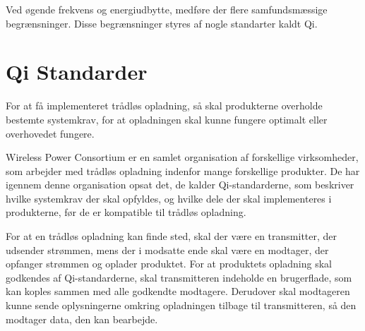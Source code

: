 Ved øgende frekvens og energiudbytte, medføre der flere samfundsmæssige begrænsninger. Disse begrænsninger styres af nogle standarter kaldt Qi.

\section{Qi Standarder}
For at få implementeret trådløs opladning, så skal produkterne overholde bestemte systemkrav, for at opladningen skal kunne fungere optimalt eller overhovedet fungere.

Wireless Power Consortium er en samlet organisation af forskellige virksomheder, som arbejder med trådløs opladning indenfor mange forskellige produkter. De har igennem denne organisation opsat det, de kalder Qi-standarderne, som beskriver hvilke systemkrav der skal opfyldes, og hvilke dele der skal implementeres i produkterne, før de er kompatible til trådløs opladning.

For at en trådløs opladning kan finde sted, skal der være en transmitter, der udsender strømmen, mens der i modsatte ende skal være en modtager, der opfanger strømmen og oplader produktet. For at produktets opladning skal godkendes af Qi-standarderne, skal transmitteren indeholde en brugerflade, som kan koples sammen med alle godkendte modtagere. Derudover skal modtageren kunne sende oplysningerne omkring opladningen tilbage til transmitteren, så den modtager data, den kan bearbejde. \cite{}
\newpage